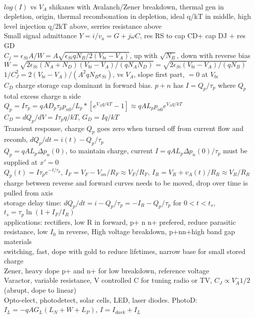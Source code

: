 \documentclass{article}
\begin{document}
\\$log(I)$ vs $V_A$ shikanes with Avalanch/Zener breakdown, thermal gen in depletion, origin, thermal recombonation in depletion, ideal q/kT in middle, high level injection q/2kT above, serries resistance above
\\Small signal admittance $Y=i/v_a=G+j\omega C$, res RS to cap CD+ cap DJ + res GD
\\$C_j=\epsilon_{Si}A/W=A\sqrt{\epsilon_{Si}qN_B/2(V_{bi}-V_A)}$, up with $\sqrt{N_B}$, down with reverse bias
\\$W=\sqrt{2\epsilon_{Si}(N_A+N_D)(V_{bi}-V_A)/(qN_AN_D)}=\sqrt{2\epsilon_{Si}(V_{bi}-V_A)/(qN_B)}$
\\$1/C_J^2=2(V_{bi}-V_A)/(A^2qN_B\epsilon_{Si})$, vs $V_A$, slope first part, $=0$ at $V_{bi}$
\\$C_D$ charge storage cap dominant in forward bias. $p+n$ has $I=Q_p/\tau_p$ where $Q_p$ total excess charge n side
\\$Q_p=I\tau_p=qAD_p\tau_pp_{n0}/L_p * [e^{V_A q/kT}-1]\approx qAL_pp_{n0}e^{V_A q/kT}$
\\$C_D=dQ_p/dV=I\tau_pq/kT$, $G_D=Iq/kT$
\\Transient response, charge $Q_p$ goes zero when turned off from current flow and recomb, $dQ_p/dt=i(t)-Q_p/\tau_p$
\\$Q_p=qAL_p\Delta p_n(0)$, to maintain charge, current $I=qAL_p\Delta p_n(0)/\tau_p$ must be supplied at $x'=0$
\\$Q_p(t)=I\tau_pe^{-t/\tau_p}$, $I_F=V_F-V_{on}/R_F\approx V_F/R_F$, $I_R=V_R+v_A(t)/R_R\approx V_R/R_R$
\\charge between reverse and forward curves needs to be moved, drop over time is pulled from axis
\\storage delay time: $dQ_p/dt=i-Q_p/\tau_p=-I_R-Q_p/\tau_p$ for $0<t<t_s$, $t_s=\tau_p\ln(1+I_F/I_R)$
\\applications: rectifiers, low R in forward, p+ n n+ prefered, reduce parasitic resistance, low $I_0$ in reverse, High voltage breakdown, p+nn+high band gap materials
\\switching, fast, dope with gold to reduce lifetimes, narrow base for small stored charge
\\Zener, heavy dope p+ and n+ for low breakdown, reference voltage
\\Varactor, variable resistance, V controlled C for tuning radio or TV, $C_J\propto V_A^-1/2$ (abrupt, dope to linear)
\\Opto-elect, photodetect, solar cells, LED, laser diodes. PhotoD: $I_L=-qAG_L(L_N+W+L_P)$, $I=I_{dark}+I_L$
\end{document}
